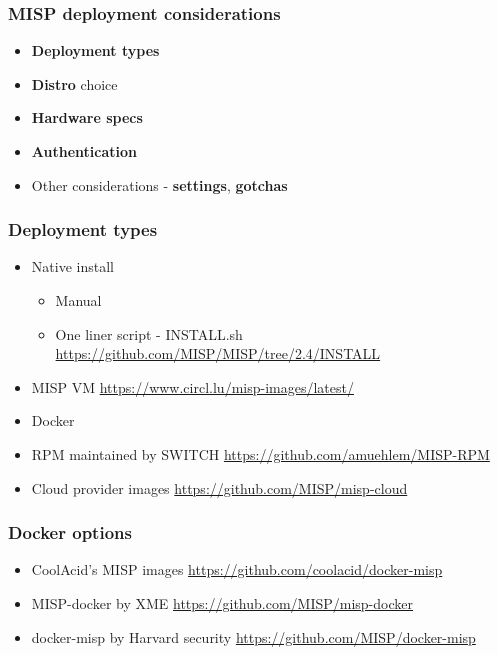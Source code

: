 
\begin{frame}[t,plain]
\titlepage
\end{frame}

\begin{frame}
\frametitle{MISP deployment considerations}
    \begin{itemize}
        \item {\bf Deployment types}
        \item {\bf Distro} choice
        \item {\bf Hardware specs}
        \item {\bf Authentication}
        \item Other considerations - {\bf settings}, {\bf gotchas}
    \end{itemize}
\end{frame}

\begin{frame}
\frametitle{Deployment types}
    \begin{itemize}
        \item Native install
        \begin{itemize}
            \item Manual
            \item One liner script - INSTALL.sh \url{https://github.com/MISP/MISP/tree/2.4/INSTALL}
        \end{itemize}
        \item MISP VM  \url{https://www.circl.lu/misp-images/latest/}
        \item Docker
        \item RPM maintained by SWITCH \url{https://github.com/amuehlem/MISP-RPM}
        \item Cloud provider images  \url {https://github.com/MISP/misp-cloud}
    \end{itemize}
\end{frame}

\begin{frame}
\frametitle{Docker options}
    \begin{itemize}
        \item CoolAcid's MISP images \url{https://github.com/coolacid/docker-misp}
	\item MISP-docker by XME \url{https://github.com/MISP/misp-docker}
        \item docker-misp by Harvard security \url{https://github.com/MISP/docker-misp}
    \end{itemize}
\end{frame}

